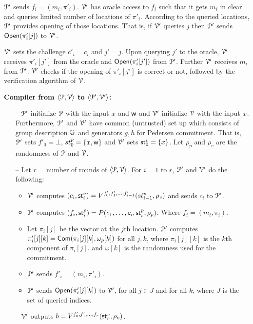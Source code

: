 $\mathcal{P}'$ sends $f_i = (m_i, \pi'_i)$. $\mathcal{V}'$ has oracle access to $f_i$ such that it gets $m_i$ in clear and queries limited number of locations of $\pi'_i$. According to the queried locations, $\mathcal{P}'$ provides opening of those locations. That is, if $\mathcal{V}'$ queries $j$ then $\mathcal{P}'$ sends $\mathsf{Open}(\pi'_i[j])$ to $\mathcal{V}'$.

$\mathcal{V}'$ sets the challenge $c'_i = c_i$ and $j' = j$. Upon querying $j'$ to the oracle, $\mathcal{V}'$ receives $\pi'_i[j']$ from the oracle and $\mathsf{Open}(\pi'_i[j'])$ from $\mathcal{P}'$. Further $\mathcal{V}'$ receives $m_i$ from $\mathcal{P}'$. $\mathcal{V}'$ checks if the opening of $\pi'_i[j']$ is correct or not, followed by the verification algorithm of $\mathcal{V}$. 

\textbf{Compiler from $\langle \mathcal{P},\mathcal{V}\rangle$ to $\langle \mathcal{P}',\mathcal{V}'\rangle$:}
\begin{itemize}
	\item[--] $\mathcal{P}'$ initialize $\mathcal{P}$ with the input ${x}$ and $\mathsf{w}$ and $\mathcal{V}'$ initialize $\mathcal{V}$ with the input ${x}$. Furthermore, $\mathcal{P}'$ and $\mathcal{V}'$ have common (untrusted) set up which consists of group description $\mathbb{G}$ and generators $g, h$ for Pedersen commitment. That is, $\mathcal{P}'$ sets $f'_0 = \bot$, $st^p_0 = \{{x}, \mathsf{w}\}$ and $\mathcal{V}'$ sets $\mathsf{st}^v_0 = \{{x}\}$. Let $\rho_p$ and $\rho_v$ are the randomness of $\mathcal{P}$ and $\mathcal{V}$.
	
	\item[--] Let $r$ = number of rounds of $\langle \mathcal{P},\mathcal{V}\rangle$.
	For $i = 1$ to $r$, $\mathcal{P}'$ and $\mathcal{V}'$ do the following: 
	\begin{itemize}
		\item $\mathcal{V}'$ computes $(c_i,\mathsf{st}^v_i) = V^{f'_0, f'_1, \ldots, f'_{i-1}}(st^v_{i-1}, \rho_v)$ and sends $c_i$ to $\mathcal{P}'$.
		\item $\mathcal{P}'$ computes $(f_i,\mathsf{st}^p_i) = P(c_1, \ldots, c_{i}, \mathsf{st}^p_i, \rho_p)$. Where $f_i = (m_i, \pi_i)$.
		\item Let $\pi_i[j]$ be the vector at the $j$th location. $\mathcal{P}'$ computes $\pi'_i[j][k] = \mathsf{Com}(\pi_i[j][k], \omega_p[k])$ for all $j,k$, where $\pi_i[j][k]$ is the $k$th component of $\pi_i[j]$. and $\omega[k]$ is the randomness used for the commitment.
		\item $\mathcal{P}'$ sends $f'_i = (m_i, \pi'_i)$.
		\item $\mathcal{P}'$ sends $\mathsf{Open}(\pi'_i[j][k])$ to $\mathcal{V}'$, for all $j\in J$ and for all $k$, where $J$ is the set of queried indices. 
	\end{itemize} 
	\item[--] $\mathcal{V}'$ outputs $b = V^{f'_0, f'_1, \ldots, f_r} ( \mathsf{st}^v_r , \rho_v)$.
\end{itemize}


